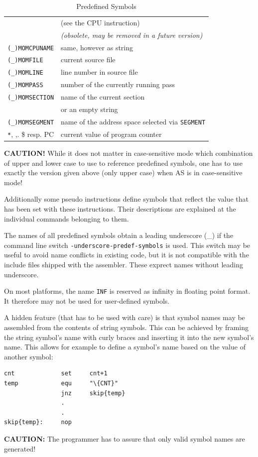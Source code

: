 \documentclass[12pt,twoside]{report}
\newcommand{\bb}[1]{{\bf #1}}
\newcommand{\tty}[1]{{\tt #1}}
\newcommand{\asname}{{AS}}
\newcommand{\predefsym}[1]{{\tt (\_)#1}}
\begin{document}
\begin{table}[htb]
\begin{center}
\begin{tabular}{|l|l|}
                         & (see the CPU instruction) \\
                         & {\em (obsolete, may be removed in a future version) } \\
\predefsym{MOMCPUNAME}   & same, however as string \\
\predefsym{MOMFILE}      & current source file \\
\predefsym{MOMLINE}      & line number in source file \\
\predefsym{MOMPASS}      & number of the currently running pass \\
\predefsym{MOMSECTION}   & name of the current section \\
                         & or an empty string \\
\predefsym{MOMSEGMENT}   & name of the address space selected via \tty{SEGMENT} \\
\verb!*!, ,. \$ resp. PC & current value of program counter \\
\hline
\end{tabular}\end{center}
\caption{Predefined Symbols\label{TabPredefined}}
\end{table}
\bb{CAUTION!}  While it does not matter in case-sensitive mode which
combination of upper and lower case to use to reference predefined
symbols, one has to use exactly the version given above (only upper
case) when \asname{} is in case-sensitive mode!

Additionally some pseudo instructions define symbols that reflect the
value that has been set  with these instructions.  Their descriptions
are explained at the individual commands belonging to them.

The names of all predefined symbols obtain a leading underscore (\_)
if the command line switch \tty{-underscore-predef-symbols} is used.
This switch may be useful to avoid name conflicts in existing code,
but it is not compatible with the include files shipped with the
assembler.  These exprect names without leading underscore.

On most platforms, the name {\tt INF} is reserved as infinity in
floating point format.  It therefore may not be used for user-defined
symbols.

A hidden feature (that has to be used with care) is that symbol names
may be assembled from the contents of string symbols.  This can be
achieved by framing the string symbol's name with curly braces and
inserting it into the new symbol's name.  This allows for example to
define a symbol's name based on the value of another symbol:
\begin{verbatim}
cnt             set     cnt+1
temp            equ     "\{CNT}"
                jnz     skip{temp}
                .
                .
skip{temp}:     nop
\end{verbatim}
\bb{CAUTION:} The programmer has to assure that only valid symbol names
are generated!
\end{document}
